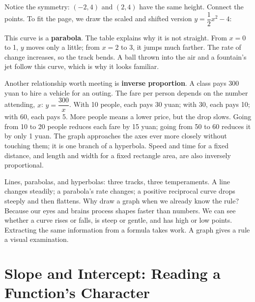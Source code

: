 Notice the symmetry: $(-2, 4)$ and $(2, 4)$ have the same height. Connect the points. To fit the page, we draw the scaled and shifted version $y = \dfrac{1}{2}x^2 - 4$:

\begin{center}
\end{center}

This curve is a \textbf{parabola}. The table explains why it is not straight. From $x=0$ to 1, $y$ moves only a little; from $x=2$ to 3, it jumps much farther. The rate of change increases, so the track bends. A ball thrown into the air and a fountain's jet follow this curve, which is why it looks familiar.

Another relationship worth meeting is \textbf{inverse proportion}. A class pays 300 yuan to hire a vehicle for an outing. The fare per person depends on the number attending, $x$: $y = \dfrac{300}{x}$. With 10 people, each pays 30 yuan; with 30, each pays 10; with 60, each pays 5. More people means a lower price, but the drop slows. Going from 10 to 20 people reduces each fare by 15 yuan; going from 50 to 60 reduces it by only 1 yuan. The graph approaches the axes ever more closely without touching them; it is one branch of a hyperbola. Speed and time for a fixed distance, and length and width for a fixed rectangle area, are also inversely proportional.

Lines, parabolas, and hyperbolas: three tracks, three temperaments. A line changes steadily; a parabola's rate changes; a positive reciprocal curve drops steeply and then flattens. Why draw a graph when we already know the rule? Because our eyes and brains process shapes faster than numbers. We can see whether a curve rises or falls, is steep or gentle, and has high or low points. Extracting the same information from a formula takes work. A graph gives a rule a visual examination.

\section{Slope and Intercept: Reading a Function's Character}

